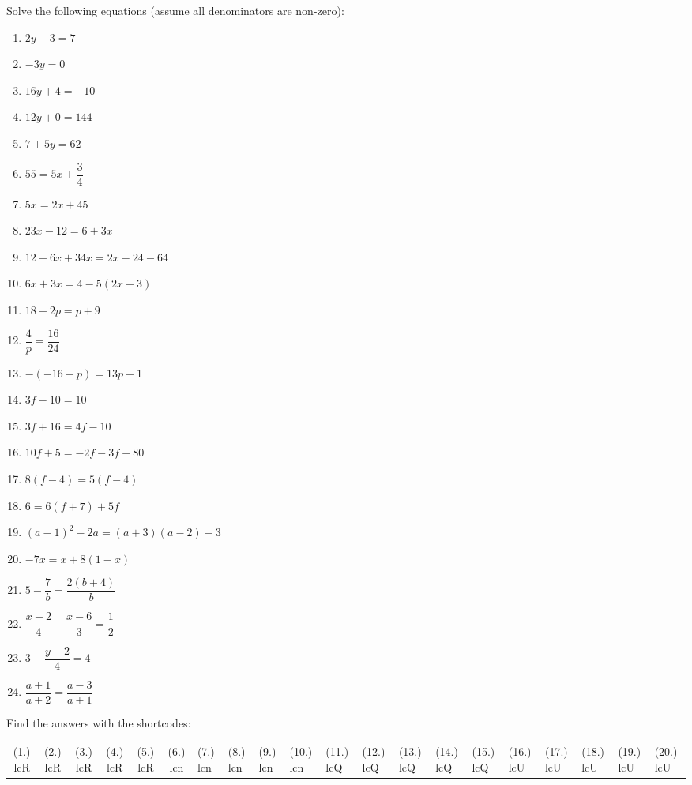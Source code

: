 \begin{exercises}{}
{
Solve the following equations (assume all denominators are non-zero): \\

\begin{multicols}{2}
\begin{enumerate}[itemsep=6pt, label=\textbf{\arabic*}. ] 
\item   $2y-3=7$
\item   $-3y=0$        
\item   $16y+4=-10$        
\item   $12y+0=144$
\item   $7+5y=62$       
\item  $55=5x+\dfrac{3}{4}$ 
\item   $5x=2x+45$        
\item  $23x-12=6+3x$
\item   $12-6x+34x=2x-24-64$
\item   $6x+3x=4-5(2x-3)$
\item   $18-2p=p+9$   
\item   $\dfrac{4}{p}=\dfrac{16}{24}$
\item   $-(-16-p)=13p-1$
\item   $3f-10=10$
\item   $3f+16=4f-10$
\item   $10f+5=-2f-3f+80$
\item   $8(f-4)=5(f-4)$
\item  $6=6(f+7)+5f$      
\item $(a-1)^{2} - 2a = (a+3)(a-2) - 3$
\item $-7x = x+8(1-x)$ 
\item $5-\dfrac{7}{b} = \dfrac{2(b+4)}{b}$
\item $\dfrac{x+2}{4} - \dfrac{x-6}{3} = \dfrac{1}{2}$
\item $ 3 - \dfrac{y-2}{4} = 4$
\item $ \dfrac{a+1}{a+2} = \dfrac{a-3}{a+1}$
  
\end{enumerate}
\end{multicols}
\practiceinfo
\par {} Find the answers with the shortcodes:
\par \begin{tabular}[h]{cccccc}
(1.) lcR  &  (2.) lcR  &  (3.) lcR  &  (4.) lcR  &  (5.) lcR  &  (6.) lcn  &  (7.) lcn  &  (8.) lcn  &  (9.) lcn  &  (10.) lcn  &  (11.) lcQ  &  (12.) lcQ  &  (13.) lcQ  &  (14.) lcQ  &  (15.) lcQ  &  (16.) lcU  &  (17.) lcU  &  (18.) lcU  &  (19.) lcU  &  (20.) lcU  & \end{tabular}
}
\end{exercises}

